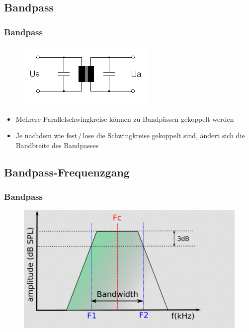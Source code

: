 \subsection*{Bandpass}
\begin{frame}
  \frametitle{Bandpass}
  \begin{center}
    \begin{figure}
      \includegraphics[width=\textwidth,height=.5\textheight,keepaspectratio]{a04/BandpassSpulen.png}
    \end{figure}
  \end{center}
  \begin{itemize}
    \item Mehrere Parallelschwingkreise können zu Bandpässen gekoppelt werden
    \item Je nachdem wie fest\,/\,lose die Schwingkreise gekoppelt sind, ändert sich die Bandbreite des Bandpasses
  \end{itemize}
\end{frame}
\subsection*{Bandpass-Frequenzgang}
\begin{frame}
  \frametitle{Bandpass}
  \begin{center}
    \begin{figure}
      \includegraphics[width=\textwidth,height=.8\textheight,keepaspectratio]{a04/Bandpass_frequenzgang.png}
    \end{figure}
\end{center}
\end{frame}

